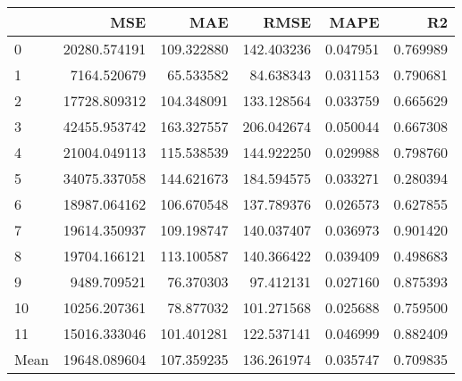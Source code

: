 \begin{tabular}{lrrrrr}
\toprule
 & MSE & MAE & RMSE & MAPE & R2 \\
\midrule
0 & 20280.574191 & 109.322880 & 142.403236 & 0.047951 & 0.769989 \\
1 & 7164.520679 & 65.533582 & 84.638343 & 0.031153 & 0.790681 \\
2 & 17728.809312 & 104.348091 & 133.128564 & 0.033759 & 0.665629 \\
3 & 42455.953742 & 163.327557 & 206.042674 & 0.050044 & 0.667308 \\
4 & 21004.049113 & 115.538539 & 144.922250 & 0.029988 & 0.798760 \\
5 & 34075.337058 & 144.621673 & 184.594575 & 0.033271 & 0.280394 \\
6 & 18987.064162 & 106.670548 & 137.789376 & 0.026573 & 0.627855 \\
7 & 19614.350937 & 109.198747 & 140.037407 & 0.036973 & 0.901420 \\
8 & 19704.166121 & 113.100587 & 140.366422 & 0.039409 & 0.498683 \\
9 & 9489.709521 & 76.370303 & 97.412131 & 0.027160 & 0.875393 \\
10 & 10256.207361 & 78.877032 & 101.271568 & 0.025688 & 0.759500 \\
11 & 15016.333046 & 101.401281 & 122.537141 & 0.046999 & 0.882409 \\
Mean & 19648.089604 & 107.359235 & 136.261974 & 0.035747 & 0.709835 \\
\bottomrule
\end{tabular}
